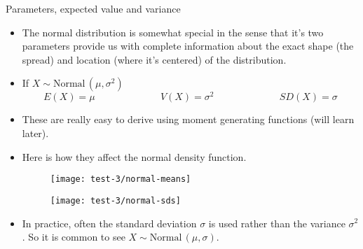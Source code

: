 \documentclass{article}
\newcommand{\follow}[1]{\sim \text{#1}\,}		%
\begin{document}
Parameters, expected value and variance\bigskip
\begin{itemize}
    \item The normal distribution is somewhat special in the sense that it's two parameters provide us with complete information about the exact shape (the spread) and location (where it's centered) of the distribution.
    \item If $X \follow{Normal}(\mu, \sigma^2)$
    \[E(X) = \mu \hspace{80pt} V(X) = \sigma^2 \hspace{80pt} SD(X) = \sigma\]
    \item These are really easy to derive using moment generating functions (will learn later).
    \item Here is how they affect the normal density function.
    \begin{figure}[H]
       \begin{minipage}{0.45\textwidth}
            \center\texttt{[image: test-3/normal-means]}
        \end{minipage}
       \begin{minipage}{0.45\textwidth}
            \center\texttt{[image: test-3/normal-sds]}
        \end{minipage}
    \end{figure}
    \item In practice, often the standard deviation $\sigma$ is used rather than the variance $\sigma^2$. So it is common to see $X \follow{Normal}(\mu, \sigma)$.
\end{itemize}\bigskip
\end{document}
